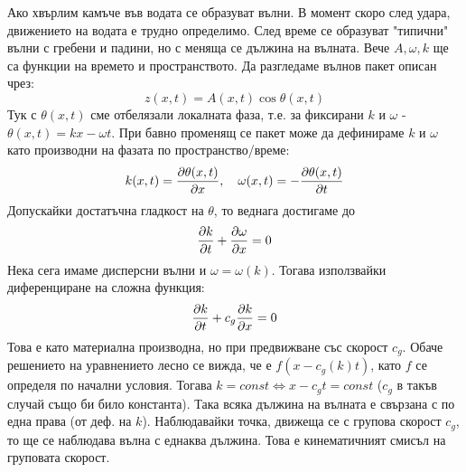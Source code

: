 Ако хвърлим камъче във водата се образуват вълни. 
В момент скоро след удара, движението на водата е трудно определимо.
След време се образуват "типични" вълни с гребени и падини, но с меняща се дължина на вълната.
Вече $A, \omega, k$ ще са функции на времето и пространството.
Да разгледаме вълнов пакет описан чрез:
\begin{equation*}
	z(x, t) = A(x, t) \cos \theta(x, t)
\end{equation*}
Тук с $\theta (x, t)$ сме отбелязали локалната фаза, т.е. за фиксирани $k$ и $\omega$ - $\theta (x, t) = k x -  \omega t$.
При бавно променящ се пакет може да дефинираме $k$ и $\omega$ като производни на фазата по пространство/време:
\begin{equation*}
	k(x, t) = \pdv{\theta(x, t)}{x}, \quad  \omega(x, t) = -\pdv{\theta(x, t)}{t}
\end{equation*}
Допускайки достатъчна гладкост на $\theta$, то веднага достигаме до 
\begin{equation*}
	\pdv{k}{t} + \pdv{\omega}{x} = 0
\end{equation*}
Нека сега имаме дисперсни вълни и $\omega = \omega (k)$. 
Тогава използвайки диференциране на сложна функция: 
\begin{equation}
	\pdv{k}{t} + c_g\pdv{k}{x} = 0
\end{equation}
Това е като материална производна, но при предвижване със скорост $c_g$.
Обаче решението на уравнението лесно се вижда, че е $f(x - c_g(k) t)$, като $f$ се определя по начални условия.
Тогава $k = const \iff x - c_g t = const$ ($c_g$ в такъв случай също би било константа).
Така всяка дължина на вълната е свързана с по една права (от деф. на $k$).
Наблюдавайки точка, движеща се с групова скорост $c_g$, то ще се наблюдава вълна с еднаква дължина.
Това е кинематичният смисъл на груповата скорост.

